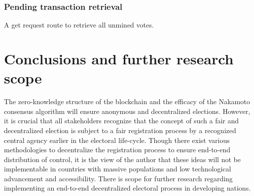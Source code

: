 \documentclass{article}
\begin{document}
    \subsubsection{Pending transaction retrieval}
    A get request route to retrieve all unmined votes.

    \section{Conclusions and further research scope}
    The zero-knowledge structure of the blockchain and the efficacy of the Nakamoto consensus algorithm will ensure anonymous and decentralized elections. However, it is crucial that all stakeholders recognize that the concept of such a fair and decentralized election is subject to a fair registration process by a recognized central agency earlier in the electoral life-cycle. Though there exist various methodologies to decentralize the registration process to ensure end-to-end distribution of control, it is the view of the author that these ideas will not be implementable in countries with massive populations and low technological advancement and accessibility. There is scope for further research regarding implementing an end-to-end decentralized electoral process in developing nations.
\end{document}
